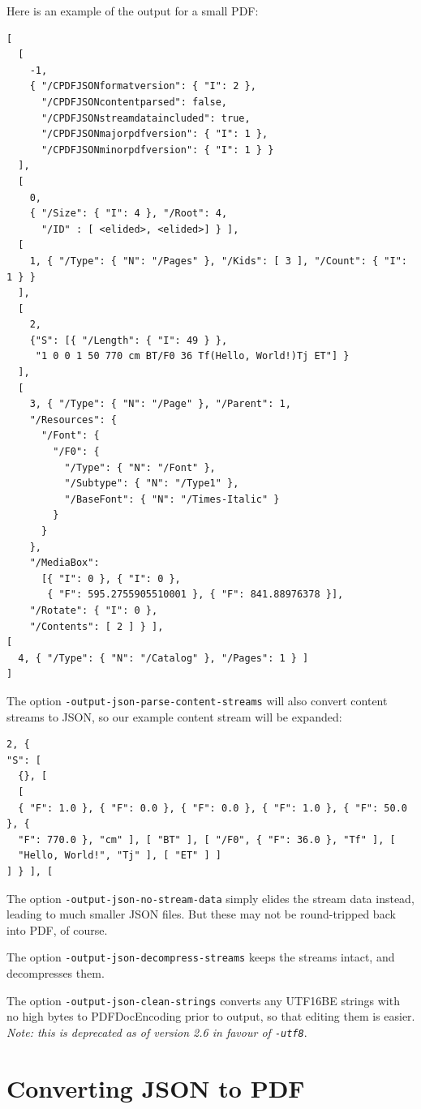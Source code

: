 \documentclass{book}
\begin{document}
\noindent Here is an example of the output for a small PDF:

{\small\begin{verbatim}
[
  [
    -1,
    { "/CPDFJSONformatversion": { "I": 2 },
      "/CPDFJSONcontentparsed": false,
      "/CPDFJSONstreamdataincluded": true,
      "/CPDFJSONmajorpdfversion": { "I": 1 },
      "/CPDFJSONminorpdfversion": { "I": 1 } }
  ],
  [
    0,
    { "/Size": { "I": 4 }, "/Root": 4,
      "/ID" : [ <elided>, <elided>] } ],
  [
    1, { "/Type": { "N": "/Pages" }, "/Kids": [ 3 ], "/Count": { "I": 1 } }
  ],
  [
    2,
    {"S": [{ "/Length": { "I": 49 } },
     "1 0 0 1 50 770 cm BT/F0 36 Tf(Hello, World!)Tj ET"] }
  ],
  [
    3, { "/Type": { "N": "/Page" }, "/Parent": 1,
    "/Resources": {
      "/Font": {
        "/F0": {
          "/Type": { "N": "/Font" },
          "/Subtype": { "N": "/Type1" },
          "/BaseFont": { "N": "/Times-Italic" }
        }
      }
    },
    "/MediaBox":
      [{ "I": 0 }, { "I": 0 },
       { "F": 595.2755905510001 }, { "F": 841.88976378 }],
    "/Rotate": { "I": 0 },
    "/Contents": [ 2 ] } ],
[
  4, { "/Type": { "N": "/Catalog" }, "/Pages": 1 } ]
]\end{verbatim}}

\noindent The option \texttt{-output-json-parse-content-streams} will also convert content streams to JSON, so our example content stream will be expanded:


{\small\begin{verbatim}
2, {
"S": [
  {}, [
  [
  { "F": 1.0 }, { "F": 0.0 }, { "F": 0.0 }, { "F": 1.0 }, { "F": 50.0 }, {
  "F": 770.0 }, "cm" ], [ "BT" ], [ "/F0", { "F": 36.0 }, "Tf" ], [
  "Hello, World!", "Tj" ], [ "ET" ] ]
] } ], [
\end{verbatim}}

\noindent The option \texttt{-output-json-no-stream-data} simply elides the stream data instead, leading to much smaller JSON files. But these may not be round-tripped back into PDF, of course.

The option \texttt{-output-json-decompress-streams} keeps the streams intact, and decompresses them.

The option \texttt{-output-json-clean-strings} converts any UTF16BE strings with no high bytes to PDFDocEncoding prior to output, so that editing them is easier. \textit{Note: this is deprecated as of version 2.6 in favour of \texttt{\textup{-utf8}}}.

\section{Converting JSON to PDF}
\end{document}

